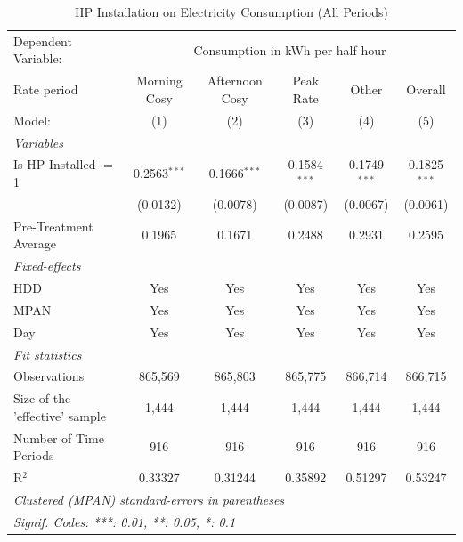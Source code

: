 
\begin{table}[htbp]
   \caption{\label{tab:hp-did-full} HP Installation on Electricity Consumption (All Periods)}
   \centering
   \begin{tabular}{lccccc}
      \tabularnewline \midrule \midrule
      Dependent Variable: & \multicolumn{5}{c}{Consumption in kWh per half hour}\\
      Rate period                    & Morning Cosy   & Afternoon Cosy & Peak Rate      & Other          & Overall \\   
      Model:                         & (1)            & (2)            & (3)            & (4)            & (5)\\  
      \midrule
      \emph{Variables}\\
      Is HP Installed $=$ 1          & 0.2563$^{***}$ & 0.1666$^{***}$ & 0.1584$^{***}$ & 0.1749$^{***}$ & 0.1825$^{***}$\\   
                                     & (0.0132)       & (0.0078)       & (0.0087)       & (0.0067)       & (0.0061)\\   
      \midrule
      Pre-Treatment Average          & 0.1965         & 0.1671         & 0.2488         & 0.2931         & 0.2595\\  
\midrule
      \emph{Fixed-effects}\\
      HDD                            & Yes            & Yes            & Yes            & Yes            & Yes\\  
      MPAN                           & Yes            & Yes            & Yes            & Yes            & Yes\\  
      Day                            & Yes            & Yes            & Yes            & Yes            & Yes\\  
      \midrule
      \emph{Fit statistics}\\
      Observations                   & 865,569        & 865,803        & 865,775        & 866,714        & 866,715\\  
      Size of the 'effective' sample & 1,444          & 1,444          & 1,444          & 1,444          & 1,444\\  
      Number of Time Periods         & 916            & 916            & 916            & 916            & 916\\  
      R$^2$                          & 0.33327        & 0.31244        & 0.35892        & 0.51297        & 0.53247\\  
      \midrule \midrule
      \multicolumn{6}{l}{\emph{Clustered (MPAN) standard-errors in parentheses}}\\
      \multicolumn{6}{l}{\emph{Signif. Codes: ***: 0.01, **: 0.05, *: 0.1}}\\
   \end{tabular}
\end{table}


